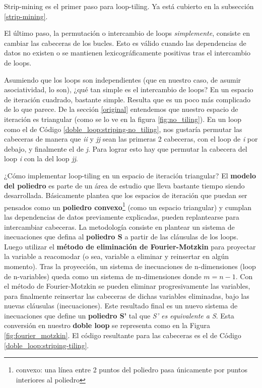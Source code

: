 \documentclass{article}
\begin{document}
Strip-mining es el primer paso para loop-tiling. Ya está cubierto en la subsección \ref{strip-mining}.


El último paso, la permutación o intercambio de loops \textit{simplemente}, consiste en cambiar las cabeceras de los bucles.
Esto es válido cuando las dependencias de datos no existen o se mantienen lexicográficamente positivas
tras el intercambio de loops.


Asumiendo que los loops son independientes (que en nuestro caso, de asumir asociatividad, lo son),
¿qué tan simple es el intercambio de loops? En un espacio de iteración cuadrado, bastante simple. Resulta
que es un poco más complicado de lo que parece. De la sección \ref{original} entendemos que
nuestro espacio de iteración es triangular (como se lo ve en la figura \ref{fig:no_tiling}).
En un loop como el de Código \ref{doble_loop:striping-no_tiling}, nos gustaría permutar las cabeceras de manera que
\textit{ii} y \textit{jj} sean las primeras 2 cabeceras, con el loop de \textit{i} por debajo, y finalmente
el de \textit{j}. Para lograr esto hay que permutar la cabecera del loop \textit{i} con la del loop \textit{jj}.


¿Cómo implementar loop-tiling en un espacio de iteración triangular? El \textbf{modelo del poliedro} es parte
de un área de estudio que lleva bastante tiempo siendo desarrollada. Básicamente plantea que los espacios
de iteración que puedan ser pensados como un \textbf{poliedro convexo}\footnote{convexo: una línea entre 2 puntos
del poliedro pasa únicamente por puntos interiores al poliedro} (como un espacio triangular) y cumplan las dependencias
de datos previamente explicadas, pueden replantearse para intercambiar cabeceras. La metodología consiste en
plantear un sistema de inecuaciones que defina al \textbf{poliedro S} a partir de las cláusulas de los loops. Luego utilizar
el \textbf{método de eliminación de Fourier-Motzkin} para proyectar la variable a reacomodar (o sea, variable a eliminar y
reinsertar en algún momento). Tras la proyección, un sistema de inecuaciones de n-dimensiones (loop de n-variables)
queda como un sistema de m-dimensiones donde $m=n-1$. Con el método de Fourier-Motzkin se pueden eliminar progresivamente las variables,
para finalmente reinsertar las cabeceras de dichas variables eliminadas, bajo las nuevas cláusulas (inecuaciones). Este resultado
final es un nuevo sistema de inecuaciones que define un \textbf{poliedro S'} tal que \textit{S' es equivalente a S}.
Esta conversión en nuestro \textbf{doble loop} se representa como en la Figura \ref{fig:fourier_motzkin}. El código
resultante para las cabeceras es el de Código \ref{doble_loop:striping-tiling}.
\end{document}
